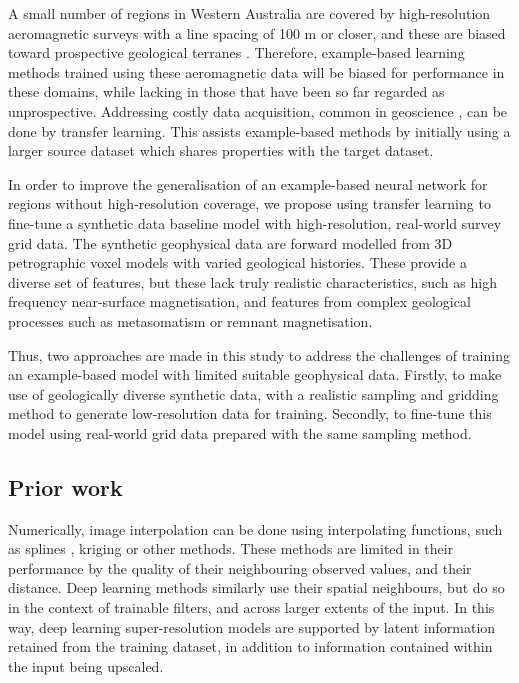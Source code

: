 A small number of regions in Western Australia are covered by high-resolution aeromagnetic surveys with a line spacing of 100 m or closer, and these are biased toward prospective geological terranes \parencite{howardAirborneGeophysicalCoverage2004}.
Therefore, example-based learning methods trained using these aeromagnetic data will be biased for performance in these domains, while lacking in those that have been so far regarded as unprospective.
Addressing costly data acquisition, common in geoscience \parencite{dawsonImpactDatasetSize2023}, can be done by transfer learning.
This assists example-based methods by initially using a larger source dataset which shares properties with the target dataset.

In order to improve the generalisation of an example-based neural network for regions without high-resolution coverage, we propose using transfer learning \parencite{tanSurveyDeepTransfer2018} to fine-tune a synthetic data baseline model with high-resolution, real-world survey grid data.
The synthetic geophysical data \parencite{jessellNoddyverseMassiveData2022} are forward modelled from 3D petrographic voxel models with varied geological histories.
These provide a diverse set of features, but these lack truly realistic characteristics, such as high frequency near-surface magnetisation, and features from complex geological processes such as metasomatism or remnant magnetisation.

Thus, two approaches are made in this study to address the challenges of training an example-based model with limited suitable geophysical data.
Firstly, to make use of geologically diverse synthetic data, with a realistic sampling and gridding method to generate low-resolution data for training.
Secondly, to fine-tune this model using real-world grid data prepared with the same sampling method.

\subsection{Prior work}
Numerically, image interpolation can be done using interpolating functions, such as splines \parencite{keysCubicConvolutionInterpolation1981}, kriging \parencite{hansenInterpretiveGriddingAnisotropic1993} or other methods.
These methods are limited in their performance by the quality of their neighbouring observed values, and their distance.
Deep learning methods similarly use their spatial neighbours, but do so in the context of trainable filters, and across larger extents of the input.
In this way, deep learning super-resolution models are supported by latent information retained from the training dataset, in addition to information contained within the input being upscaled.

